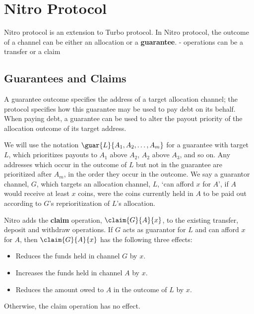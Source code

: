 \section{Nitro Protocol}

Nitro protocol is an extension to Turbo protocol.
In Nitro protocol, the outcome of a channel can be either an allocation or a \textbf{guarantee}.
- operations can be a transfer or a claim

\subsection{Guarantees and Claims}

A guarantee outcome specifies the address of a target allocation channel; the protocol specifies how this guarantee may be used to pay debt on its behalf.
When paying debt, a guarantee can be used to alter the payout priority of the allocation outcome of its target address. 


We will use the notation $\guar{L}{A_1, A_2, \dots, A_m}$ for a guarantee with target $L$, which prioritizes payouts to $A_1$ above $A_2$, $A_2$ above $A_3$, and so on.
Any addresses which occur in the outcome of $L$ but not in the guarantee are prioritized after $A_m$, in the order they occur in the outcome.
We say a guarantor channel, $G$, which targets an allocation channel, $L$, `can afford $x$ for $A$', if $A$ would receive at least $x$ coins, were the coins currently held in $A$ to be paid out according to $G$'s reprioritization of $L$'s allocation.

Nitro adds the \textbf{claim} operation, $\claim{G}{A}{x}$, to the existing transfer, deposit and withdraw operations.
If $G$ acts as guarantor for $L$ and can afford $x$ for $A$, then $\claim{G}{A}{x}$ has the following three effects:
\begin{itemize}
  \item Reduces the funds held in channel $G$ by $x$.
  \item Increases the funds held in channel $A$ by $x$.
  \item Reduces the amount owed to $A$ in the outcome of $L$ by $x$.
\end{itemize}
Otherwise, the claim operation has no effect.

